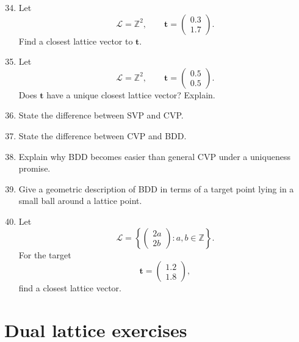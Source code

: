 \documentclass[11pt]{article}
\begin{document}
\begin{enumerate}
	\setcounter{enumi}{33}
	\item Let
	\[
	\mathcal{L}=\mathbb{Z}^2,
	\qquad
	\mathbf{t}=
	\begin{pmatrix}
		0.3\\1.7
	\end{pmatrix}.
	\]
	Find a closest lattice vector to \(\mathbf{t}\).
	
	\item Let
	\[
	\mathcal{L}=\mathbb{Z}^2,
	\qquad
	\mathbf{t}=
	\begin{pmatrix}
		0.5\\0.5
	\end{pmatrix}.
	\]
	Does \(\mathbf{t}\) have a unique closest lattice vector? Explain.
	
	\item State the difference between SVP and CVP.
	
	\item State the difference between CVP and BDD.
	
	\item Explain why BDD becomes easier than general CVP under a uniqueness promise.
	
	\item Give a geometric description of BDD in terms of a target point lying in a small ball around a lattice point.
	
	\item Let
	\[
	\mathcal{L}=
	\left\{
	\begin{pmatrix}
		2a\\2b
	\end{pmatrix}
	: a,b\in\mathbb{Z}
	\right\}.
	\]
	For the target
	\[
	\mathbf{t}=
	\begin{pmatrix}
		1.2\\1.8
	\end{pmatrix},
	\]
	find a closest lattice vector.
\end{enumerate}

\section{Dual lattice exercises}
\end{document}
